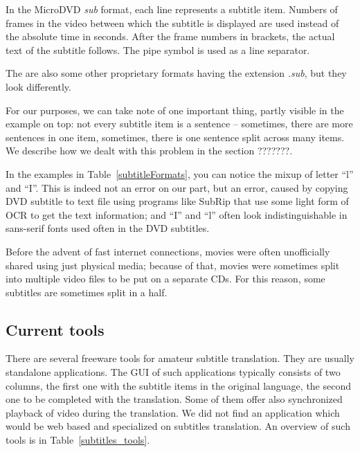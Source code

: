 In the MicroDVD \emph{sub} format, each line represents a subtitle item. Numbers of frames in the video between which the subtitle is displayed are used instead of the absolute time in seconds. After the frame numbers in brackets, the actual text of the subtitle follows. The pipe symbol is used as a line separator.

The are also some other proprietary formats having the extension \emph{.sub}, but they look differently.

For our purposes, we can take note of one important thing, partly visible in the example on top: not every subtitle item is a sentence -- sometimes, there are more sentences in one item, sometimes, there is one sentence split across many items. We describe how we dealt with this problem in the section ???????.

In the examples in Table~\ref{subtitleFormats}, you can notice the mixup of letter ``l'' and ``I''. This is indeed not an error on our part, but an error, caused by copying DVD subtitle to text file using programs like SubRip that use some light form of OCR to get the text information; and ``I'' and ``l'' often look indistinguishable in sans-serif fonts used often in the DVD subtitles.

Before the advent of fast internet connections, movies were often unofficially shared using just physical media; because of that, movies were sometimes split into multiple video files to be put on a separate CDs. For this reason, some subtitles are sometimes split in a half.

\subsection{Current tools}

There are several freeware tools for amateur subtitle translation. They are usually standalone applications. The GUI of such applications typically consists of two columns, the first one with the subtitle items in the original language, the second one to be completed with the translation. Some of them offer also synchronized playback of video during the translation. We did not find an application which would be web based and specialized on subtitles translation. An overview of such tools is in Table~\ref{subtitles_tools}.

